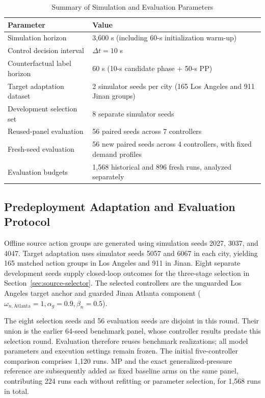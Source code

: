 \documentclass[letterpaper,journal]{IEEEtran}
\begin{document}
\begin{table}[!t]
\centering
\caption{Summary of Simulation and Evaluation Parameters}
\label{tab:hyperparams}
\begin{tabular}{@{}lp{}@{}}
\toprule
Parameter & Value\\
\midrule
Simulation horizon & 3,600 s (including 60-s initialization warm-up)\\
Control decision interval & $\Delta t = 10$ s\\
Counterfactual label horizon & 60 s (10-s candidate phase + 50-s PP)\\
Target adaptation dataset & 2 simulator seeds per city (165 Los Angeles and 911 Jinan groups)\\
Development selection set & 8 separate simulator seeds\\
Reused-panel evaluation & 56 paired seeds across 7 controllers\\
Fresh-seed evaluation & 56 new paired seeds across 4 controllers, with fixed demand profiles\\
Evaluation budgets & 1,568 historical and 896 fresh runs, analyzed separately\\
\bottomrule
\end{tabular}
\end{table}

\subsection{Predeployment Adaptation and Evaluation Protocol}
Offline source action groups are generated using simulation seeds 2027, 3037, and 4047. Target adaptation uses simulator seeds 5057 and 6067 in each city, yielding 165 matched action groups in Los Angeles and 911 in Jinan. Eight separate development seeds supply closed-loop outcomes for the three-stage selection in Section~\ref{sec:source-selector}. The selected controllers are the unguarded Los Angeles target anchor and guarded Jinan Atlanta component ($\omega_{n,\mathrm{Atlanta}}=1, \alpha_g=0.9, \beta_n=0.5$).

The eight selection seeds and 56 evaluation seeds are disjoint in this round. Their union is the earlier 64-seed benchmark panel, whose controller results predate this selection round. Evaluation therefore reuses benchmark realizations; all model parameters and execution settings remain frozen. The initial five-controller comparison comprises 1,120 runs. MP and the exact generalized-pressure reference are subsequently added as fixed baseline arms on the same panel, contributing 224 runs each without refitting or parameter selection, for 1,568 runs in total.
\end{document}

